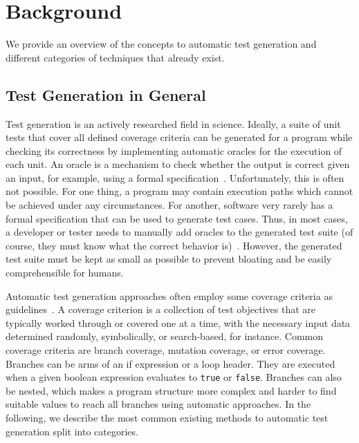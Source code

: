 \documentclass[paper=a4,%
  twoside,%
  BCOR4mm,%
  abstract=true,%
  toc=bibliography,%
  chapterprefix=true,%
  toc=bibliographynumbered,%
  open=right,%
  english,%
  pagesize=pdftex]{scrreprt}
\begin{document}
\clearpage

\chapter{Background}
\label{chap:backgroud}
We provide an overview of the concepts to automatic test generation and different categories of techniques that already exist.

\section{Test Generation in General}
Test generation is an actively researched field in science. Ideally, a suite of unit tests that cover all defined coverage criteria can be generated for a program while checking its correctness by implementing automatic oracles for the execution of each unit. An oracle is a mechanism to check whether the output is correct given an input, for example, using a formal specification~\cite{McMinn2009}. Unfortunately, this is often not possible. For one thing, a program may contain execution paths which cannot be achieved under any circumstances. For another, software very rarely has a formal specification that can be used to generate test cases. Thus, in most cases, a developer or tester needs to manually add oracles to the generated test suite (of course, they must know what the correct behavior is)~\cite{Fraser_2013}. However, the generated test suite must be kept as small as possible to prevent bloating and be easily comprehensible for humans.

Automatic test generation approaches often employ some coverage criteria as guidelines~\cite{Fraser_2011a}. A coverage criterion is a collection of test objectives that are typically worked through or covered one at a time, with the necessary input data determined randomly, symbolically, or search-based, for instance. Common coverage criteria are branch coverage, mutation coverage, or error coverage. Branches can be arms of an if expression or a loop header. They are executed when a given boolean expression evaluates to \texttt{true} or \texttt{false}. Branches can also be nested, which makes a program structure more complex and harder to find suitable values to reach all branches using automatic approaches. In the following, we describe the most common existing methods to automatic test generation split into categories.

\end{document}
